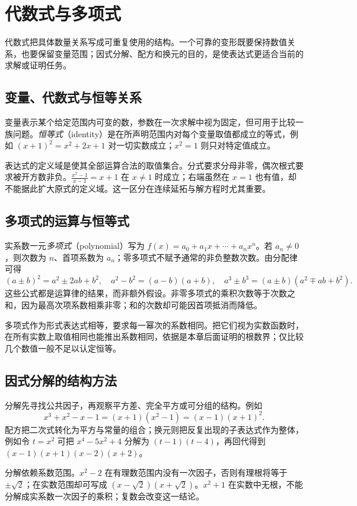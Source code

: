 \setcounter{chapter}{3} %
\chapter{代数式与多项式}
\label{chap:em-expressions}
代数式把具体数量关系写成可重复使用的结构。一个可靠的变形既要保持数值关系，也要保留变量范围；因式分解、配方和换元的目的，是使表达式更适合当前的求解或证明任务。

\section{变量、代数式与恒等关系}
变量表示某个给定范围内可变的数，参数在一次求解中视为固定，但可用于比较一族问题。\emph{恒等式}（identity）是在所声明范围内对每个变量取值都成立的等式，例如 $(x+1)^2=x^2+2x+1$ 对一切实数成立；$x^2=1$ 则只对特定值成立。

表达式的定义域是使其全部运算合法的取值集合。分式要求分母非零，偶次根式要求被开方数非负。$\frac{x^2-1}{x-1}=x+1$ 在 $x\ne1$ 时成立；右端虽然在 $x=1$ 也有值，却不能据此扩大原式的定义域。这一区分在连续延拓与解方程时尤其重要。

\section{多项式的运算与恒等式}
实系数一元\emph{多项式}（polynomial）写为 $f(x)=a_0+a_1x+\cdots+a_nx^n$。若 $a_n\ne0$，则次数为 $n$、首项系数为 $a_n$；零多项式不赋予通常的非负整数次数。由分配律可得
\[
 (a\pm b)^2=a^2\pm2ab+b^2,\quad
 a^2-b^2=(a-b)(a+b),\quad
 a^3\pm b^3=(a\pm b)(a^2\mp ab+b^2).
\]
这些公式都是运算律的结果，而非额外假设。非零多项式的乘积次数等于次数之和，因为最高次项系数相乘非零；和的次数却可能因首项抵消而降低。

多项式作为形式表达式相等，要求每一幂次的系数相同。把它们视为实数函数时，在所有实数上取值相同也能推出系数相同，依据是本章后面证明的根数界；仅比较几个数值一般不足以认定恒等。

\section{因式分解的结构方法}
分解先寻找公共因子，再观察平方差、完全平方或可分组的结构。例如
\[
 x^3+x^2-x-1=(x+1)(x^2-1)=(x-1)(x+1)^2.
\]
配方把二次式转化为平方与常量的组合；换元则把反复出现的子表达式作为整体，例如令 $t=x^2$ 可把 $x^4-5x^2+4$ 分解为 $(t-1)(t-4)$，再回代得到 $(x-1)(x+1)(x-2)(x+2)$。

分解依赖系数范围。$x^2-2$ 在有理数范围内没有一次因子，否则有理根将等于 $\pm\sqrt2$；在实数范围却可写成 $(x-\sqrt2)(x+\sqrt2)$。$x^2+1$ 在实数中无根，不能分解成实系数一次因子的乘积；复数会改变这一结论。

